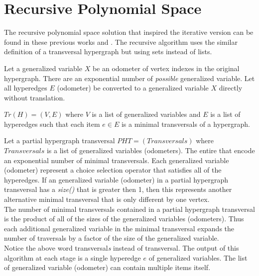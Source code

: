 \chapter{Recursive Polynomial Space}

The recursive polynomial space solution that inspired the iterative version can be found in these previous works \cite{kavvadias1999evaluation} and \cite{kavvadias2005efficient}. The recursive algorithm uses the similar definition of a transversal hypergraph but using sets instead of lists.

\begin{definition}
	Let a generalized variable $X$ be an odometer of vertex indexes in the original hypergraph. There are an exponential number of \textit{possible} generalized variable. Let all hyperedges $E$ (odometer) be converted to a generalized variable $X$ directly without translation.
\end{definition}
	
\begin{definition}
$Tr(H) = (V,E)$ where $V$ is a list of generalized variables and $E$ is a list of hyperedges such that each item $e\in E$ is a minimal transversals of a hypergraph.
\end{definition}

\begin{definition}
	
\end{definition}
Let a partial hypergraph transversal $PHT = (Transversals)$ where $Transversals$ is a list of generalized variables (odometers). The entire  that encode an exponential number of minimal transversals. Each generalized variable (odometer) represent a choice selection operator that satisfies all of the hyperedges. If an generalized variable (odometer) in a partial hypergraph transversal has a \textit{size()} that is greater then 1, then this represents another alternative minimal transversal that is only different by one vertex.\\ 

The number of minimal transversals contained in a partial hypergraph transversal is the product of all of the sizes of the generalized variables (odometers). Thus each additional generalized variable in the minimal transversal expands the number of traversals by a factor of the size of the generalized variable.\\



Notice the above word transversal\textit{s} instead of transversal. The output of this algorithm at each stage is a single hyperedge $e$ of generalized variables. The list of generalized variable (odometer) can contain multiple items itself. 


